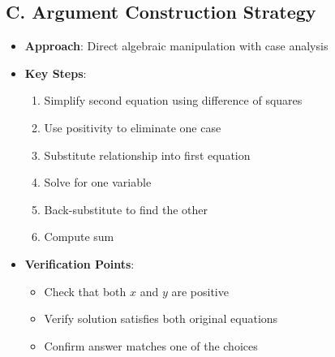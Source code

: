 \documentclass[12pt]{article}
\begin{document}
\begin{strategicbox}
\subsection*{C. Argument Construction Strategy}
\begin{itemize}[leftmargin=*]
    \item \textbf{Approach}: Direct algebraic manipulation with case analysis
    \item \textbf{Key Steps}:
    \begin{enumerate}
        \item Simplify second equation using difference of squares
        \item Use positivity to eliminate one case
        \item Substitute relationship into first equation
        \item Solve for one variable
        \item Back-substitute to find the other
        \item Compute sum
    \end{enumerate}
    \item \textbf{Verification Points}: 
    \begin{itemize}
        \item Check that both $x$ and $y$ are positive
        \item Verify solution satisfies both original equations
        \item Confirm answer matches one of the choices
    \end{itemize}
\end{itemize}
\end{strategicbox}
\end{document}
